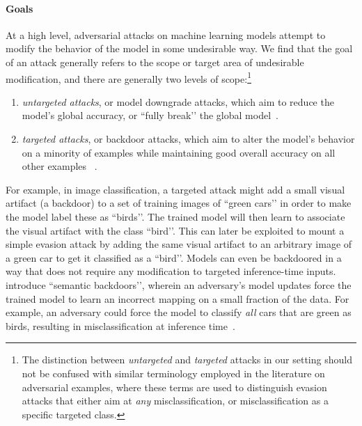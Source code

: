 \documentclass[11pt]{article}
\begin{document}
\paragraph{Goals}
At a high level, adversarial attacks on machine learning models attempt to modify the behavior of the model in some undesirable way. We find that the goal of an attack generally refers to the scope or target area of undesirable modification, and there are generally two levels of scope:\footnote{The distinction between \emph{untargeted} and \emph{targeted} attacks in our setting should not be confused with similar terminology employed in the literature on adversarial examples, where these terms are used to distinguish evasion attacks that either aim at \emph{any} misclassification, or misclassification as a specific targeted class.}

\begin{enumerate}

\item 
\textit{untargeted attacks}, or model downgrade attacks, which aim to reduce the model's global accuracy, or ``fully break’’ the global model~\cite{Biggio:2012:PAA:3042573.3042761}.

\item
\textit{targeted attacks}, or backdoor attacks, which aim to alter the model’s behavior on a minority of examples while maintaining good overall accuracy on all other examples ~\cite{chen2017targeted, DBLP:conf/ndss/LiuMALZW018, bagdasaryan18backdoor, pmlr-v97-bhagoji19a}.

\end{enumerate}

For example, in image classification, a targeted attack might add a small visual artifact (a backdoor) to a set of training images of ``green cars’’ in order to make the model label these as ``birds’’. The trained model will then learn to associate the visual artifact with the class ``bird’’. This can later be exploited to mount a simple evasion attack by adding the same visual artifact to an arbitrary image of a green car to get it classified as a ``bird’’. Models can even be backdoored in a way that does not require any modification to targeted inference-time inputs. \citet{bagdasaryan18backdoor} introduce ``semantic backdoors’’, wherein an adversary's model updates force the trained model to learn an incorrect mapping on a small fraction of the data. For example, an adversary could force the model to classify \emph{all} cars that are green as birds, resulting in misclassification at inference time~\citep{bagdasaryan18backdoor}.
\end{document}
